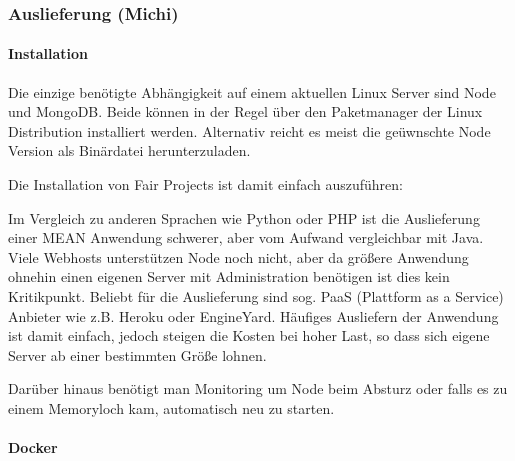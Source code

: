 \subsubsection{Auslieferung (Michi)}\label{auslieferung-michi}

\paragraph{Installation}\label{installation}

Die einzige benötigte Abhängigkeit auf einem aktuellen Linux Server sind
Node und MongoDB. Beide können in der Regel über den Paketmanager der
Linux Distribution installiert werden. Alternativ reicht es meist die
geüwnschte Node Version als Binärdatei herunterzuladen.

Die Installation von Fair Projects ist damit einfach auszuführen:

\begin{Shaded}
\begin{Highlighting}[]
 
 

 

 

 
\end{Highlighting}
\end{Shaded}

Im Vergleich zu anderen Sprachen wie Python oder PHP ist die
Auslieferung einer MEAN Anwendung schwerer, aber vom Aufwand
vergleichbar mit Java. Viele Webhosts unterstützen Node noch nicht, aber
da größere Anwendung ohnehin einen eigenen Server mit Administration
benötigen ist dies kein Kritikpunkt. Beliebt für die Auslieferung sind
sog. PaaS (Plattform as a Service) Anbieter wie z.B. Heroku oder
EngineYard. Häufiges Ausliefern der Anwendung ist damit einfach, jedoch
steigen die Kosten bei hoher Last, so dass sich eigene Server ab einer
bestimmten Größe lohnen.

Darüber hinaus benötigt man Monitoring um Node beim Absturz oder falls
es zu einem Memoryloch kam, automatisch neu zu starten.

\paragraph{Docker}\label{docker}


